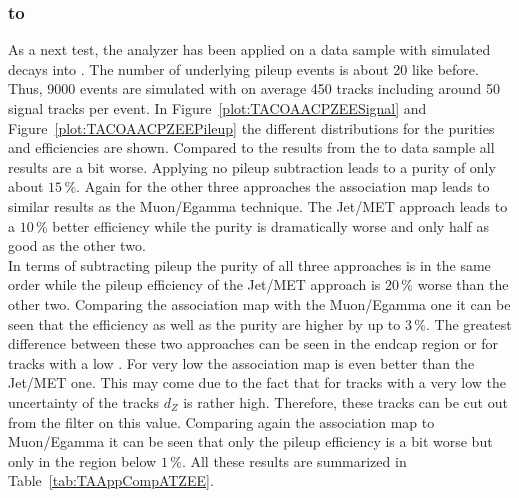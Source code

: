 \clearpage{}

\subsubsection{\Zz to \EE \label{sec:TASEFRDACPZEE}}
As a next test, the analyzer has been applied on a data sample with simulated \Zz decays into \EE. The number of underlying pileup events is about 20 like before. Thus, 9000 events are simulated with on average 450 tracks including around 50 signal tracks per event. In Figure~\ref{plot:TACOAACPZEESignal} and Figure~\ref{plot:TACOAACPZEEPileup} the different distributions for the purities and efficiencies are shown. Compared to the results from the \Zz to \MM data sample all results are a bit worse. Applying no pileup subtraction leads to a purity of only about $15\,\%$. Again for the other three approaches the association map leads to similar results as the Muon/Egamma technique. The Jet/MET approach leads to a $10\,\%$ better efficiency while the purity is dramatically worse and only half as good as the other two. \\
In terms of subtracting pileup the purity of all three approaches is in the same order while the pileup efficiency of the Jet/MET approach is $20\,\%$ worse than the other two. Comparing the association map with the Muon/Egamma one it can be seen that the efficiency as well as the purity are higher by up to $3\,\%$. The greatest difference between these two approaches can be seen in the endcap region or for tracks with a low \pt. For very low \pt the association map is even better than the Jet/MET one. This may come due to the fact that for tracks with a very low \pt the uncertainty of the tracks $d_{Z}$ is rather high. Therefore, these tracks can be cut out from the filter on this value. Comparing again the association map to Muon/Egamma it can be seen that only the pileup efficiency is a bit worse but only in the region below $1\,\%$. All these results are summarized in Table~\ref{tab:TAAppCompATZEE}.

